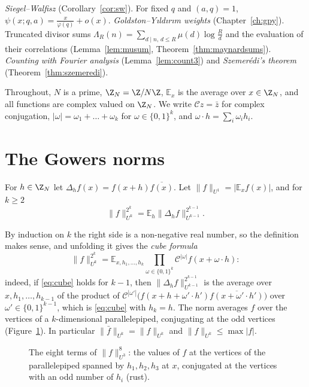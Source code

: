 \begin{reminder}
\emph{Siegel--Walfisz} (Corollary~\ref{cor:sw}). For fixed $q$ and $(a,q)=1$, $\psi(x;q,a)=\frac x{\varphi(q)}+o(x)$.
\emph{Goldston--Yıldırım weights} (Chapter~\ref{ch:gpy}). Truncated divisor sums $\Lambda_R(n)=\sum_{d\mid n,\,d\le R}\mu(d)\log\frac Rd$ and the evaluation of their correlations (Lemma~\ref{lem:musum}, Theorem~\ref{thm:maynardsums}).
\emph{Counting with Fourier analysis} (Lemma~\ref{lem:count3}) and \emph{Szemerédi's theorem} (Theorem~\ref{thm:szemeredi}).
\end{reminder}

Throughout, $N$ is a prime, $\Z_N=\Z/N\Z$, $\mathbb E_{x}$ is the average over $x\in\Z_N$, and all functions are complex valued on $\Z_N$. We write $\mathcal C z=\bar z$ for complex conjugation, $|\omega|=\omega_1+\dots+\omega_k$ for $\omega\in\{0,1\}^k$, and $\omega\cdot h=\sum_i\omega_ih_i$.

\section{The Gowers norms}

\begin{definition}\label{def:gowers}
For $h\in\Z_N$ let $\Delta_hf(x)=f(x+h)\overline{f(x)}$. Let $\|f\|_{U^1}=|\mathbb E_xf(x)|$, and for $k\ge2$
\[
\|f\|_{U^k}^{2^k}=\mathbb E_h\|\Delta_hf\|_{U^{k-1}}^{2^{k-1}}.
\]
\end{definition}

By induction on $k$ the right side is a non-negative real number, so the definition makes sense, and unfolding it gives the \emph{cube formula}
\begin{equation}\label{eq:cube}
\|f\|_{U^k}^{2^k}=\mathbb E_{x,h_1,\dots,h_k}\prod_{\omega\in\{0,1\}^k}\mathcal C^{|\omega|}f(x+\omega\cdot h):
\end{equation}
indeed, if \eqref{eq:cube} holds for $k-1$, then $\|\Delta_hf\|_{U^{k-1}}^{2^{k-1}}$ is the average over $x,h_1,\dots,h_{k-1}$ of the product of $\mathcal C^{|\omega'|}\bigl(f(x+h+\omega'\cdot h')\overline{f(x+\omega'\cdot h')}\bigr)$ over $\omega'\in\{0,1\}^{k-1}$, which is \eqref{eq:cube} with $h_k=h$. The norm averages $f$ over the vertices of a $k$-dimensional parallelepiped, conjugating at the odd vertices (Figure~\ref{fig:cube}). In particular $\|\bar f\|_{U^k}=\|f\|_{U^k}$ and $\|f\|_{U^k}\le\max|f|$.

\begin{figure}[ht]
\centering
{}
\caption{The eight terms of $\|f\|_{U^3}^8$: the values of $f$ at the vertices of the parallelepiped spanned by $h_1,h_2,h_3$ at $x$, conjugated at the vertices with an odd number of $h_i$ (rust).}
\label{fig:cube}
\end{figure}

